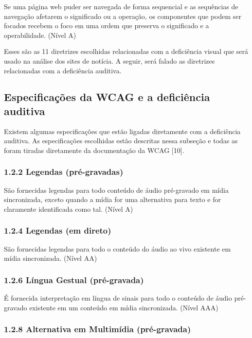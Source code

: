 \documentclass[a4paper]{article}
\begin{document}
\begin{titlepage}
Se uma página web puder ser navegada de forma sequencial e as sequências de navegação afetarem o significado ou a operação, os componentes que podem ser focados recebem o foco em uma ordem que preserva o significado e a operabilidade. (Nível A)

Esses são as 11 diretrizes escolhidas relacionadas com a deficiência visual que será usado na análise dos sites de notícia. A seguir, será falado as diretrizes relacionadas com a deficiência auditiva.

\subsection{Especificações da WCAG e a deficiência auditiva}

Existem algumas especificações que estão ligadas diretamente com a deficiência auditiva. As especificações escolhidas estão descritas nessa subseção e todas as foram tiradas diretamente da documentação da WCAG [10].

\subsubsection{1.2.2 Legendas (pré-gravadas)}

São fornecidas legendas para todo conteúdo de áudio pré-gravado em mídia sincronizada, exceto quando a mídia for uma alternativa para texto e for claramente identificada como tal. (Nível A)

\subsubsection{1.2.4 Legendas (em direto)}

São fornecidas legendas para todo o conteúdo do áudio ao vivo existente em mídia sincronizada. (Nível AA)

\subsubsection{1.2.6 Língua Gestual (pré-gravada)}

É fornecida interpretação em língua de sinais para todo o conteúdo de áudio pré-gravado existente em um conteúdo em mídia sincronizada. (Nível AAA)

\subsubsection{1.2.8 Alternativa em Multimídia (pré-gravada)}


\end{titlepage}
\end{document}
